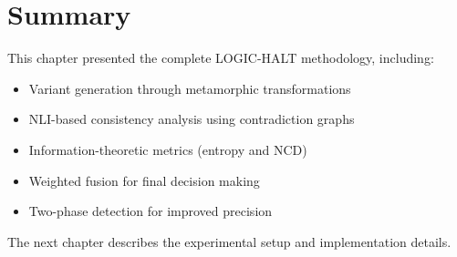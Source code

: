 \section{Summary}

This chapter presented the complete LOGIC-HALT methodology, including:

\begin{itemize}
    \item Variant generation through metamorphic transformations
    \item NLI-based consistency analysis using contradiction graphs
    \item Information-theoretic metrics (entropy and NCD)
    \item Weighted fusion for final decision making
    \item Two-phase detection for improved precision
\end{itemize}

The next chapter describes the experimental setup and implementation details.
